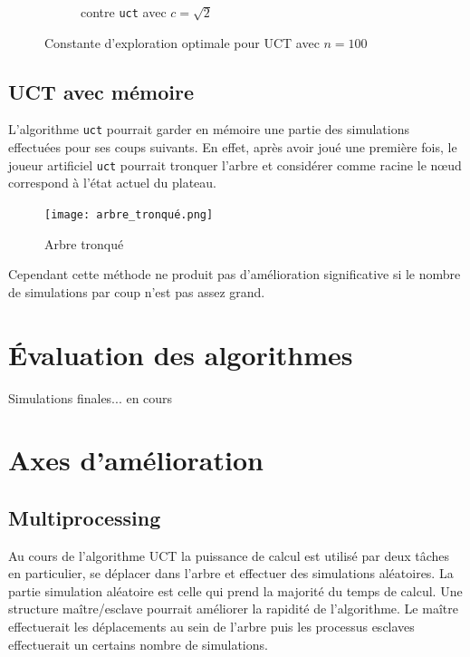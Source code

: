\documentclass[a4paper]{article}
\theoremstyle{definition}
\begin{document}
\begin{figure}[!h]
\begin{subfigure}{0.5\textwidth}
		\caption{contre \texttt{uct} avec $c = \sqrt{2}$}
		\label{fig:3_}
	\end{subfigure}
	\caption{Constante d'exploration optimale pour UCT avec $n=100$}
	\label{fig:best-cst}
\end{figure}

\subsection{UCT avec mémoire}

L'algorithme \texttt{uct} pourrait garder en mémoire une partie des simulations effectuées pour ses coups suivants. En effet, après avoir joué une première fois, le joueur artificiel \texttt{uct} pourrait tronquer l'arbre et considérer comme racine le nœud correspond à l'état actuel du plateau.\\

\begin{figure}[h]
	\centering
	\texttt{[image: arbre\_tronqué.png]}
	\caption{Arbre tronqué}
	\label{fig:arbre-tronqué}
\end{figure}

Cependant cette méthode ne produit pas d'amélioration significative si le nombre de simulations par coup n'est pas assez grand.

\newpage

\section{Évaluation des algorithmes}

Simulations finales... en cours

\newpage

\section{Axes d'amélioration}

\subsection{Multiprocessing}

Au cours de l'algorithme UCT la puissance de calcul est utilisé par deux tâches en particulier, se déplacer dans l'arbre et effectuer des simulations aléatoires. La partie simulation aléatoire est celle qui prend la majorité du temps de calcul. Une structure maître/esclave pourrait améliorer la rapidité de l'algorithme. Le maître effectuerait les déplacements au sein de l'arbre puis les processus esclaves effectuerait un certains nombre de simulations.
\end{document}
